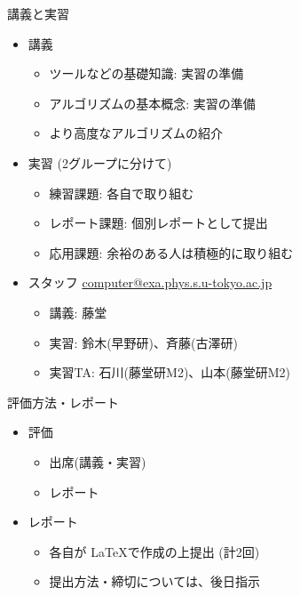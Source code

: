 \begin{frame}[t,fragile]{講義と実習}
  \begin{itemize}
  \item 講義
    \begin{itemize}
    \item ツールなどの基礎知識: 実習の準備
    \item アルゴリズムの基本概念: 実習の準備
    \item より高度なアルゴリズムの紹介
    \end{itemize}
  \item 実習 (2グループに分けて)
    \begin{itemize}
    \item 練習課題: 各自で取り組む
    \item レポート課題: 個別レポートとして提出
    \item 応用課題: 余裕のある人は積極的に取り組む
    \end{itemize}
  \item スタッフ \href{mailto:computer@exa.phys.s.u-tokyo.ac.jp}{computer@exa.phys.s.u-tokyo.ac.jp}
    \begin{itemize}
    \item 講義: 藤堂
    \item 実習: 鈴木(早野研)、斉藤(古澤研)
    \item 実習TA: 石川(藤堂研M2)、山本(藤堂研M2)
    \end{itemize}
  \end{itemize}    
\end{frame}

\begin{frame}[t,fragile]{評価方法・レポート}
  \begin{itemize}
  \item 評価
    \begin{itemize}
    \item 出席(講義・実習)
    \item レポート
    \end{itemize}    
  \item レポート
    \begin{itemize}
    \item 各自が \LaTeX で作成の上提出 (計2回)
    \item 提出方法・締切については、後日指示
    \end{itemize}
  \end{itemize}    
\end{frame}

